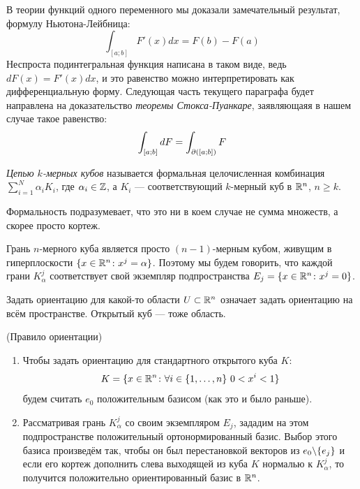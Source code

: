 \begin{note}
	В теории функций одного переменного мы доказали замечательный результат, формулу Ньютона-Лейбница:
	\[
		\int_{[a; b]} F'(x)dx = F(b) - F(a)
	\]
	Неспроста подинтегральная функция написана в таком виде, ведь $dF(x) = F'(x)dx$, и это равенство можно интерпретировать как дифференциальную форму. Следующая часть текущего параграфа будет направлена на доказательство \textit{теоремы Стокса-Пуанкаре}, заявляющаяя в нашем случае такое равенство:
	\[
		\int_{[a; b]} dF = \int_{\partial([a; b])} F
	\]
\end{note}

\begin{definition}
	\textit{Цепью $k$-мерных кубов} называется формальная целочисленная комбинация $\sum_{i = 1}^N \alpha_i K_i$, где $\alpha_i \in \mathbb{Z}$, а $K_i$ --- соответствующий $k$-мерный куб в $\mathbb{R}^n$, $n \ge k$.
\end{definition}

\begin{anote}
	Формальность подразумевает, что это ни в коем случае не сумма множеств, а скорее просто кортеж.
\end{anote}

\begin{note}
	Грань $n$-мерного куба является просто $(n - 1)$-мерным кубом, живущим в гиперплоскости $\{x \in \mathbb{R}^n \colon x^j = \alpha\}$. Поэтому мы будем говорить, что каждой грани $K_\alpha^j$ соответствует свой экземпляр подпространства $E_j = \{x \in \mathbb{R}^n \colon x^j = 0\}$.
\end{note}

\begin{anote}
	Задать ориентацию для какой-то области $U \subset \mathbb{R}^n$ означает задать ориентацию на всём пространстве. Открытый куб --- тоже область.
\end{anote}

\begin{definition} (Правило ориентации)
	\begin{enumerate}
		\item Чтобы задать ориентацию для стандартного открытого куба $K$:
		\[
			K = \{x \in \mathbb{R}^n \colon \forall i \in \{1, \ldots, n\}\ 0 < x^i < 1\}
		\]
		будем считать $e_0$ положительным базисом (как это и было раньше).
		
		\item Рассматривая грань $K_\alpha^j$ со своим экземпляром $E_j$, зададим на этом подпространстве положительный ортонормированный базис. Выбор этого базиса произведём так, чтобы он был перестановкой векторов из $e_0 \backslash \{e_j\}$ и если его кортеж дополнить слева выходящей из куба $K$ нормалью к $K_\alpha^j$, то получится положительно ориентированный базис в $\mathbb{R}^n$.
	\end{enumerate}
\end{definition}

